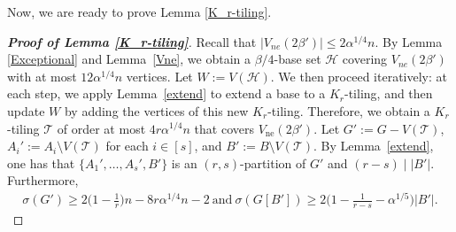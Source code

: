 \documentclass[11pt, a4paper]{article}
\theoremstyle{definition}
\newcommand{\<}{\subseteq}
\begin{document}
Now, we are ready to prove Lemma \ref{K_r-tiling}. 
\begin{proof}[\bf Proof of Lemma \ref{K_r-tiling}] 
Recall that $|V_{ne}(2\beta')|\le 2\alpha^{1/4} n$. By Lemma \ref{Exceptional} and Lemma~\ref{Vne}, we obtain a $\beta/4$-base set $\mathcal{H}$ covering $V_{ne}(2\beta')$ with at most $12\alpha^{1/4}n$ vertices. Let $W:=V(\mathcal{H})$. We then proceed iteratively: at each step, we apply Lemma~\ref{extend} to extend a base to a \( K_r \)-tiling, and then update \( W \) by adding the vertices of this new \( K_r \)-tiling. Therefore, we obtain a \( K_r \)-tiling \( \mathcal{T} \) of order at most \( 4r \alpha^{1/4} n \) that covers \( V_{\mathrm{ne}}(2\beta') \).  
Let $G':=G-V(\mathcal{T})$, $A_i':=A_i\setminus V(\mathcal{T})$ for each $i\in [s]$,  and  $B':=B\setminus V(\mathcal{T})$. %
By Lemma~\ref{extend}, one has that  $\{A_1',\ldots,A_s',B'\}$ is an $(r,s)$-partition of $G'$ and $(r-s)\mid |B'|$. %
Furthermore,  
\begin{align}\label{Ore:G'}
\sigma(G')\ge 2\Big(1- \frac{1}{r}\Big)n-8r\alpha^{1/4}n-2 \ \text{and} \ \sigma(G[B'])\ge 2\Big(1-\frac{1}{r-s}-\alpha^{1/5}\Big)|B'|.
\end{align} 


\end{proof}
\end{document}
